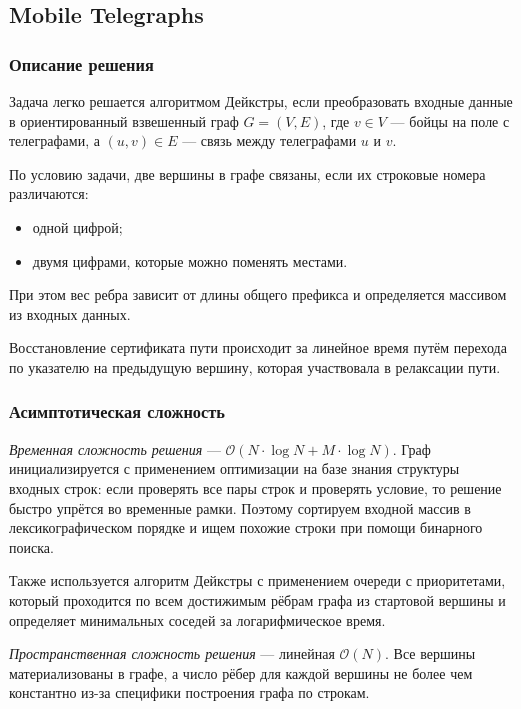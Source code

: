 \subsection{Mobile Telegraphs}

\subsubsection{Описание решения}

Задача легко решается алгоритмом Дейкстры, если преобразовать входные данные в ориентированный взвешенный граф \( G=(V,E) \), где \( v\in V \) --- бойцы на поле с телеграфами, а \( (u,v)\in E \) --- связь между телеграфами \( u \) и \( v \). 

По условию задачи, две вершины в графе связаны, если их строковые номера различаются:
\begin{itemize}
  \item одной цифрой;
  \item двумя цифрами, которые можно поменять местами.
\end{itemize}

При этом вес ребра зависит от длины общего префикса и определяется массивом из входных данных.

Восстановление сертификата пути происходит за линейное время путём перехода по указателю на предыдущую вершину, которая участвовала в релаксации пути.

\subsubsection{Асимптотическая сложность}

\textit{Временная сложность решения} --- \( \mathcal{O}(N\cdot\log N+M\cdot\log N) \). Граф инициализируется с применением оптимизации на базе знания структуры входных строк: если проверять все пары строк и проверять условие, то решение быстро упрётся во временные рамки. Поэтому сортируем входной массив в лексикографическом порядке и ищем похожие строки при помощи бинарного поиска.

Также используется алгоритм Дейкстры с применением очереди с приоритетами, который проходится по всем достижимым рёбрам графа из стартовой вершины и определяет минимальных соседей за логарифмическое время.

\textit{Пространственная сложность решения} --- линейная \( \mathcal{O}(N) \). Все вершины материализованы в графе, а число рёбер для каждой вершины не более чем константно из-за специфики построения графа по строкам.

